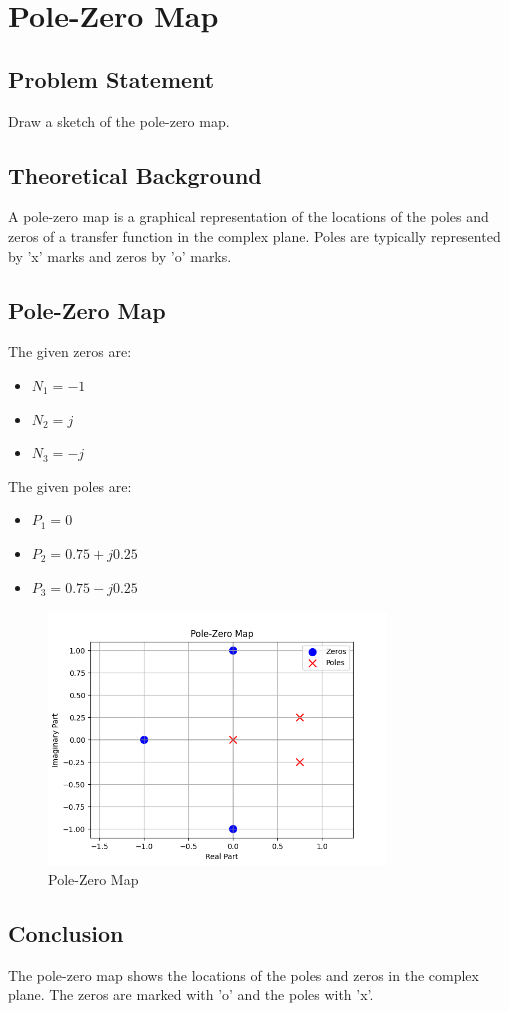 \item[(b)]
\section{Pole-Zero Map}

\subsection*{Problem Statement}
Draw a sketch of the pole-zero map.

\subsection*{Theoretical Background}
A pole-zero map is a graphical representation of the locations of the poles and zeros of a transfer function in the complex plane. Poles are typically represented by 'x' marks and zeros by 'o' marks.

\subsection*{Pole-Zero Map}
The given zeros are:
\begin{itemize}
    \item \( N_{1} = -1 \)
    \item \( N_{2} = j \)
    \item \( N_{3} = -j \)
\end{itemize}

The given poles are:
\begin{itemize}
    \item \( P_{1} = 0 \)
    \item \( P_{2} = 0.75 + j0.25 \)
    \item \( P_{3} = 0.75 - j0.25 \)
\end{itemize}

\begin{figure}[h]
    \centering
    \includegraphics[width=0.8\textwidth]{fig/ex3_b_pole_zero_map.png}
    \caption{Pole-Zero Map}
    \label{fig:ex3_b_pole_zero_map}
\end{figure}

\subsection*{Conclusion}
The pole-zero map shows the locations of the poles and zeros in the complex plane. The zeros are marked with 'o' and the poles with 'x'.
